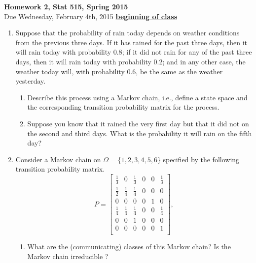 \documentclass{article}
\begin{document}
\begin{center}
\Large
{\bf Homework 2, Stat 515, Spring 2015}\\
\normalsize
Due Wednesday, February 4th, 2015 \underline{{\bf beginning of class}}\\
\end{center}
\begin{enumerate}%
\item Suppose that the probability of rain today depends on weather
  conditions from the previous three days. If it has rained for the
  past three days, then it will rain today with probability 0.8; if it
  did not rain for any of the past three days, then it will rain today
  with probability 0.2; and in any other case, the weather today will,
  with probability 0.6, be the same as the weather yesterday. 
\begin{enumerate}
\item Describe
  this process using a Markov chain, i.e., define a state space and
  the corresponding transition probability matrix for the process. 
\item Suppose you know that it rained the very first day but that it
  did not on the second and third days. What is the probability it will
  rain on the fifth day?
\end{enumerate}
\item Consider a Markov chain on $\Omega=\{1, 2, 3, 4, 5, 6\}$ specified by the following transition probability matrix.\\
\begin{equation*}
  P=
  \begin{bmatrix}
    \frac{1}{3} & 0   & \frac{1}{3}  & 0 & 0 & \frac{1}{3}\\
    \frac{1}{2} & \frac{1}{4}   & \frac{1}{4}  & 0 & 0 & 0\\
    0 & 0  & 0  & 0 & 1 & 0\\
    \frac{1}{4} & \frac{1}{4}   & \frac{1}{4}  & 0 & 0 & \frac{1}{4}\\
    0 & 0   & 1  & 0 & 0 & 0\\
    0 & 0   & 0  & 0 & 0 & 1\\
  \end{bmatrix},
\end{equation*}
\begin{enumerate}
\item What are the (communicating) classes of this Markov chain? Is the Markov chain irreducible ? 

\end{enumerate}
\end{enumerate}
\end{document}
